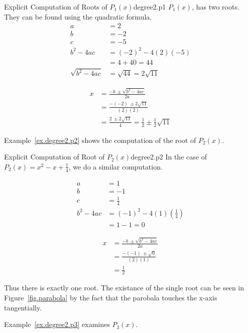 \begin{example}{Explicit Computation of Roots of $P_1(x)$}{degree2.p1}
  $P_1(x)$, has two roots.  They can be found using the quadratic formula.
  \begin{align*}
    a&=2\\
    b&=-2\\
    c&=-5\\
    b^2 - 4a c &= (-2)^2 - 4 (2) (-5)\\
    &= 4 + 40 = 44\\
    \sqrt{b^2 - 4a c} &= \sqrt{44} = 2\sqrt{11}
  \end{align*}

\begin{align}
  x &= \frac{-b~ \pm \sqrt{b^2 - 4a c}}{2a}\label{eq.quad.formula}\\
  &= \frac{-(-2)~ \pm 2\sqrt{11}}{(2)(2)}\nonumber\\
  &= \frac{2 ~\pm 2\sqrt{11}}{4}
  = \frac{1}{2} \pm \frac{1}{2}\sqrt{11}\nonumber
\end{align}
  
\end{example}

Example~\ref{ex.degree2.p2} shows the computation of the root of $P_2(x)$.

\begin{example}{Explicit Computation of Root of $P_2(x)$}{degree2.p2}
In the case of $P_2(x) = x^2 -x + \frac{1}{4}$, we do a similar computation.

\begin{align*}
  a &= 1\\
  b &= -1\\
  c &= \frac{1}{4} \\
  b^2 - 4a c &= (-1)^2 - 4 (1) (\frac{1}{4})\\
  &= 1 - 1 = 0
\end{align*}

\begin{align*}
  x &= \frac{-b~ \pm \sqrt{b^2 - 4a c}}{2a}\\
  &= \frac{-(-1)~ \pm \sqrt{0}}{(2)(1)}\\
  &= \frac{1}{2}
\end{align*}


Thus there is exactly one root.  The existance of the single root can be
seen in Figure~\ref{fig.parabola} by the fact that the
parobala touches the x-axis tangentially.
\end{example}

Example~\ref{ex.degree2.p3} examines $P_3(x)$.

